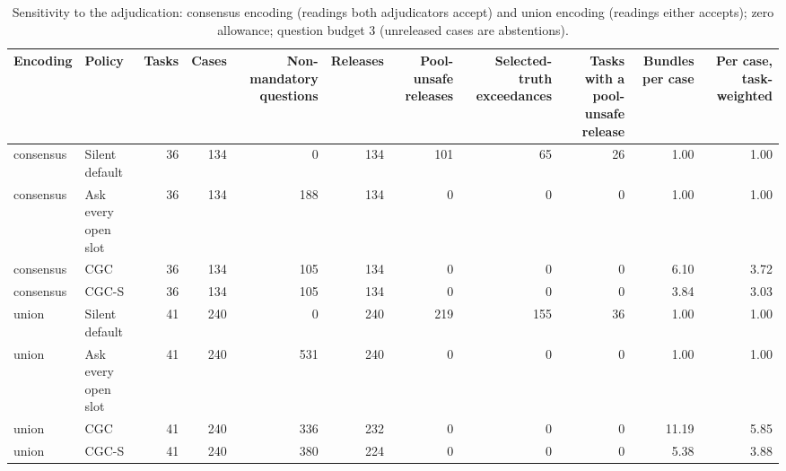 \begin{table}[t]
\centering\small
\caption{Sensitivity to the adjudication: consensus encoding (readings both adjudicators accept) and union encoding (readings either accepts); zero allowance; question budget 3 (unreleased cases are abstentions).}
\label{tab:tab_union}
\begin{tabular}{llrrrrrrrrr}
\toprule
Encoding & Policy & Tasks & Cases & Non-mandatory questions & Releases & Pool-unsafe releases & Selected-truth exceedances & Tasks with a pool-unsafe release & Bundles per case & Per case, task-weighted \\
\midrule
consensus & Silent default & 36 & 134 & 0 & 134 & 101 & 65 & 26 & 1.00 & 1.00 \\
consensus & Ask every open slot & 36 & 134 & 188 & 134 & 0 & 0 & 0 & 1.00 & 1.00 \\
consensus & CGC & 36 & 134 & 105 & 134 & 0 & 0 & 0 & 6.10 & 3.72 \\
consensus & CGC-S & 36 & 134 & 105 & 134 & 0 & 0 & 0 & 3.84 & 3.03 \\
union & Silent default & 41 & 240 & 0 & 240 & 219 & 155 & 36 & 1.00 & 1.00 \\
union & Ask every open slot & 41 & 240 & 531 & 240 & 0 & 0 & 0 & 1.00 & 1.00 \\
union & CGC & 41 & 240 & 336 & 232 & 0 & 0 & 0 & 11.19 & 5.85 \\
union & CGC-S & 41 & 240 & 380 & 224 & 0 & 0 & 0 & 5.38 & 3.88 \\
\bottomrule
\end{tabular}
\end{table}
